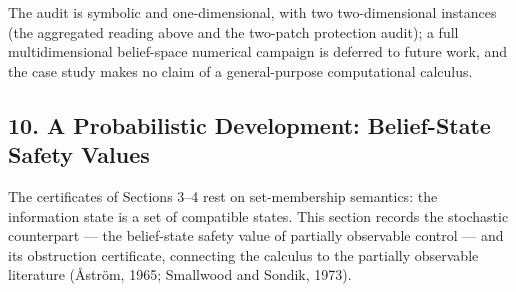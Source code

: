 \documentclass[10pt,twocolumn]{article}
\theoremstyle{definition}
\begin{document}
\begin{table}[t]
\centering
{}
\caption{The two-patch protection audit: aggregated beliefs under the reading
\(y = z_{1} + z_{2}\), audited against the exact belief-level recursion. Every
nonviable belief is certified by the common-action certificate
(Theorem~\ref{thm:common-action}); the viable beliefs carry explicit blind
witness cycles.}
\label{tab:patch}
\end{table}

The audit is symbolic and one-dimensional, with two two-dimensional instances
(the aggregated reading above and the two-patch protection audit); a full
multidimensional belief-space numerical campaign is deferred to future work,
and the case study makes no claim of a general-purpose computational calculus.

\subsection{10. A Probabilistic Development: Belief-State Safety Values}\label{probabilistic-development}

The certificates of Sections 3--4 rest on set-membership semantics: the information state is a set of compatible states. This section records the stochastic counterpart --- the belief-state safety value of partially observable control --- and its obstruction certificate, connecting the calculus to the partially observable literature (\r{A}str\"om, 1965; Smallwood and Sondik, 1973).
\end{document}
